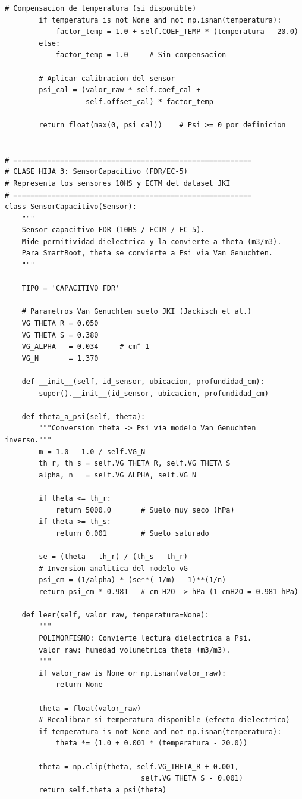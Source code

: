 \documentclass[12pt,a4paper]{article}
\begin{document}
\begin{lstlisting}[caption={Jerarquía de clases \texttt{Sensor} con herencia y polimorfismo.}, label=lst:poo1]
        # Compensacion de temperatura (si disponible)
        if temperatura is not None and not np.isnan(temperatura):
            factor_temp = 1.0 + self.COEF_TEMP * (temperatura - 20.0)
        else:
            factor_temp = 1.0     # Sin compensacion
        
        # Aplicar calibracion del sensor
        psi_cal = (valor_raw * self.coef_cal + 
                   self.offset_cal) * factor_temp
        
        return float(max(0, psi_cal))    # Psi >= 0 por definicion


# ========================================================
# CLASE HIJA 3: SensorCapacitivo (FDR/EC-5)
# Representa los sensores 10HS y ECTM del dataset JKI
# ========================================================
class SensorCapacitivo(Sensor):
    """
    Sensor capacitivo FDR (10HS / ECTM / EC-5).
    Mide permitividad dielectrica y la convierte a theta (m3/m3).
    Para SmartRoot, theta se convierte a Psi via Van Genuchten.
    """
    
    TIPO = 'CAPACITIVO_FDR'
    
    # Parametros Van Genuchten suelo JKI (Jackisch et al.)
    VG_THETA_R = 0.050
    VG_THETA_S = 0.380
    VG_ALPHA   = 0.034     # cm^-1
    VG_N       = 1.370
    
    def __init__(self, id_sensor, ubicacion, profundidad_cm):
        super().__init__(id_sensor, ubicacion, profundidad_cm)
    
    def theta_a_psi(self, theta):
        """Conversion theta -> Psi via modelo Van Genuchten inverso."""
        m = 1.0 - 1.0 / self.VG_N
        th_r, th_s = self.VG_THETA_R, self.VG_THETA_S
        alpha, n   = self.VG_ALPHA, self.VG_N
        
        if theta <= th_r:
            return 5000.0       # Suelo muy seco (hPa)
        if theta >= th_s:
            return 0.001        # Suelo saturado
        
        se = (theta - th_r) / (th_s - th_r)
        # Inversion analitica del modelo vG
        psi_cm = (1/alpha) * (se**(-1/m) - 1)**(1/n)
        return psi_cm * 0.981   # cm H2O -> hPa (1 cmH2O = 0.981 hPa)
    
    def leer(self, valor_raw, temperatura=None):
        """
        POLIMORFISMO: Convierte lectura dielectrica a Psi.
        valor_raw: humedad volumetrica theta (m3/m3).
        """
        if valor_raw is None or np.isnan(valor_raw):
            return None
        
        theta = float(valor_raw)
        # Recalibrar si temperatura disponible (efecto dielectrico)
        if temperatura is not None and not np.isnan(temperatura):
            theta *= (1.0 + 0.001 * (temperatura - 20.0))
        
        theta = np.clip(theta, self.VG_THETA_R + 0.001, 
                                self.VG_THETA_S - 0.001)
        return self.theta_a_psi(theta)
\end{lstlisting}
\end{document}
